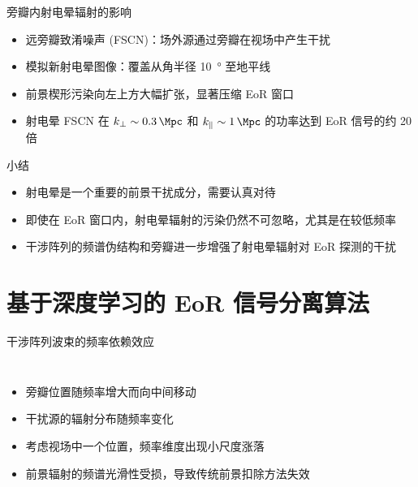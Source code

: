\documentclass{beamer}
\begin{document}
\begin{frame}{旁瓣内射电晕辐射的影响}
  \begin{itemize}
    \item \alert{远旁瓣致淆噪声 (FSCN)}：场外源通过旁瓣在视场中产生干扰
    \item 模拟新射电晕图像：覆盖从角半径 \SI{10}{\degree} 至地平线
    \item 前景楔形污染向左上方大幅扩张，显著压缩 EoR 窗口
    \item 射电晕 FSCN 在 $k_{\perp} \sim \SI{0.3}{\per\Mpc}$ 和
      $k_{\parallel} \sim \SI{1}{\per\Mpc}$ 的功率达到 EoR 信号的约 20 倍
  \end{itemize}
  \vspace{-1ex}
\end{frame}

\begin{frame}{小结}
  \begin{itemize}
    \item 射电晕是一个重要的前景干扰成分，需要认真对待
    \item 即使在 EoR 窗口内，射电晕辐射的污染仍然不可忽略，尤其是在较低频率
    \item 干涉阵列的频谱伪结构和旁瓣进一步增强了射电晕辐射对 EoR 探测的干扰
  \end{itemize}
\end{frame}


\section{基于深度学习的 EoR 信号分离算法}

\begin{frame}{干涉阵列波束的频率依赖效应}
  \begin{columns}
    \begin{itemize}
      \item 旁瓣位置随频率增大而向中间移动
      \item 干扰源的辐射分布随频率变化
      \item 考虑视场中一个位置，频率维度出现小尺度涨落
      \item 前景辐射的频谱光滑性受损，导致传统前景扣除方法失效
    \end{itemize}

  \end{columns}
\end{frame}
\end{document}
